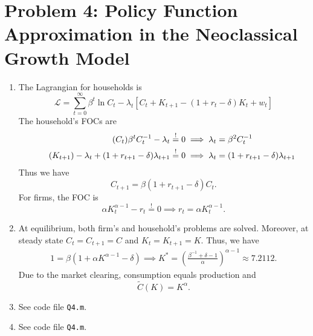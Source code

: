 \section*{Problem 4: Policy Function Approximation in the Neoclassical Growth Model}
\begin{enumerate}
\item
The Lagrangian for households is
\begin{equation}
	\mathcal L=\sum^\infty_{t=0}\beta^t\ln C_t-\lambda_t[C_t+K_{t+1}-(1+r_t-\delta)K_t+w_t]
\end{equation}
The household's FOCs are
\begin{align}
\tag{$C_t$}
	\beta^tC_t^{-1}-\lambda_t\overset{!}{=}0&\implies\lambda_t=\beta^2C_t^{-1}\\
\tag{$K_{t+1}$}
	-\lambda_t+(1+r_{t+1}-\delta)\lambda_{t+1}\overset{!}{=}0&\implies \lambda_t=(1+r_{t+1}-\delta)\lambda_{t+1}
\end{align}
Thus we have
\begin{equation}
	C_{t+1}=\beta(1+r_{t+1}-\delta)C_t.
\end{equation}
For firms, the FOC is
\begin{equation}
	\alpha K^{\alpha-1}_t-r_t\overset{!}{=}0\implies r_t=\alpha K_t^{\alpha-1}.
\end{equation}

\item At equilibrium, both firm's and household's problems are solved. Moreover, at steady state $C_t=C_{t+1}=C$ and $K_t=K_{t+1}=K$. Thus, we have
\begin{align}
	1=\beta(1+\alpha K^{\alpha-1}-\delta)\implies
	K^*=\left(\frac{\beta^{-1}+\delta-1}{\alpha}\right)^{\alpha-1}\approx7.2112.
\end{align}
Due to the market clearing, consumption equals production and
\begin{equation}
	\widetilde C(K)=K^{\alpha}.
\end{equation}

\item See code file \texttt{Q4.m}.

\item See code file \texttt{Q4.m}.


\end{enumerate}
